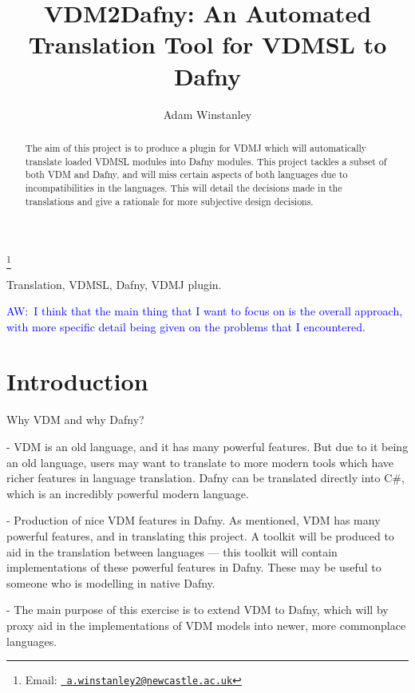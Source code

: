 \documentclass{entcs}
\newcommand{\awcomment}[1]{\ifthenelse { \boolean{showComments} } {\textcolor{blue}{AW:~#1}} { } } %
\begin{document}
\begin{frontmatter}
\title{VDM2Dafny: An Automated Translation Tool for VDMSL to Dafny}
\author{Adam Winstanley}
  \address{School of Computing Science, Newcastle University, UK} 
\thanks[adamemail]{Email:
    \href{mailto:a.winstanley2@newcastle.ac.uk} {\texttt{\normalshape
        a.winstanley2@newcastle.ac.uk}}}

			
				
\begin{abstract} 
The aim of this project is to produce a plugin for VDMJ which will automatically translate loaded VDMSL modules into Dafny modules. This project tackles a subset of both VDM and Dafny, and will miss certain aspects of both languages due to incompatibilities in the languages. This will detail the decisions made in the translations and give a rationale for more subjective design decisions.
\end{abstract}

\begin{keyword}
Translation, VDMSL, Dafny, VDMJ plugin.
\end{keyword}
\end{frontmatter}

\awcomment{I think that the main thing that I want to focus on is the overall approach, with more specific detail being given on the problems that I encountered.}

\section{Introduction}\label{sec: introduction}
Why VDM and why Dafny? 

- VDM is an old language, and it has many powerful features. But due to it being an old language, users may want to translate to more modern tools which have richer features in language translation. Dafny can be translated directly into C\#, which is an incredibly powerful modern language. 

- Production of nice VDM features in Dafny. As mentioned, VDM has many powerful features, and in translating this project. A toolkit will be produced to aid in the translation between languages --- this toolkit will contain implementations of these powerful features in Dafny. These may be useful to someone who is modelling in native Dafny. 

- The main purpose of this exercise is to extend VDM to Dafny, which will by proxy aid in the implementations of VDM models into newer, more commonplace languages.
\end{document}
